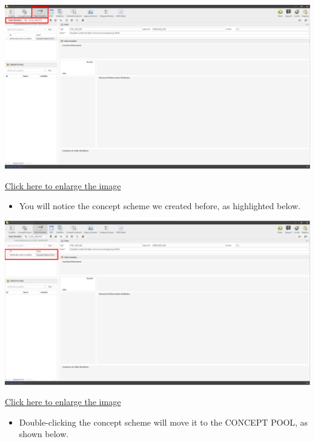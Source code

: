 \documentclass[
]{book}
\providecommand{\tightlist}{%
  \setlength{\itemsep}{0pt}\setlength{\parskip}{0pt}}
\begin{document}
\begin{center}\includegraphics[width=1\linewidth]{./images/image130} \end{center}

\href{images/image130.png}{Click here to enlarge the image}

\begin{itemize}
\tightlist
\item
  You will notice the concept scheme we created before, as highlighted below.
\end{itemize}

\begin{center}\includegraphics[width=1\linewidth]{./images/image132} \end{center}

\href{images/image132.png}{Click here to enlarge the image}

\begin{itemize}
\tightlist
\item
  Double-clicking the concept scheme will move it to the CONCEPT POOL, as shown below.
\end{itemize}
\end{document}
